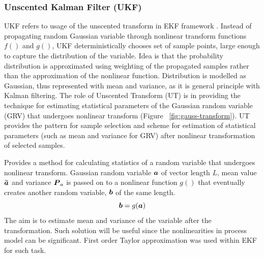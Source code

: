 \subsubsection{Unscented Kalman Filter (UKF)}\label{sec:ukf}
UKF refers to usage of the unscented transform in EKF framework \cite{julier00, wan00, ristic04}. Instead of propagating random Gaussian variable through nonlinear transform functions $f()$ and $g()$, UKF deterministically chooses set of sample points, large enough to capture the distribution of the variable. Idea is that the probability distribution is approximated using weighting of the propagated samples rather than the approximation of the nonlinear function. Distribution is modelled as Gaussian, thus represented with mean and variance, as it is general principle with Kalman filtering. The role of Unscented Transform (UT) is in providing the technique for estimating statistical parameters of the Gaussian random variable (GRV) that undergoes nonlinear transform (Figure ~\ref{fig:gauss-transform}). UT provides the pattern for sample selection and scheme for estimation of statistical parameters (such as mean and variance for GRV) after nonlinear transformation of selected samples.

 Provides a method for calculating statistics of a random variable that undergoes nonlinear transform. Gaussian random variable $\boldsymbol{a}$ of vector length $L$, mean value $\boldsymbol{\bar{a}}$ and variance $\boldsymbol{P}_{a}$ is passed on to a nonlinear function $g()$ that eventually creates another random variable, $\boldsymbol{b}$ of the same length.
$$ \boldsymbol{b} = g(\boldsymbol{a}) $$   
The aim is to estimate mean and variance of the variable after the transformation. Such solution will be useful since the nonlinearities in process model can be significant. First order Taylor approximation was used within EKF for such task.

